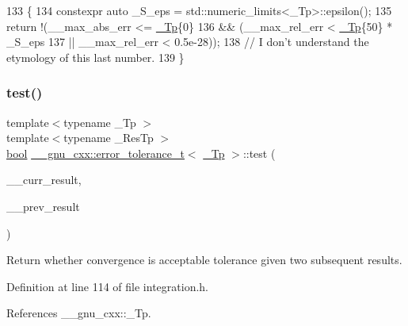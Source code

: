 \begin{DoxyCode}
133       \{
134         constexpr \textcolor{keyword}{auto} \_S\_eps = std::numeric\_limits<\_Tp>::epsilon();
135         \textcolor{keywordflow}{return} !(\_\_max\_abs\_err <= \hyperlink{namespace____gnu__cxx_a3b19a9c800ca194374ef9172290f7d79}{\_Tp}\{0\}
136               && (\_\_max\_rel\_err < \hyperlink{namespace____gnu__cxx_a3b19a9c800ca194374ef9172290f7d79}{\_Tp}\{50\} * \_S\_eps
137                || \_\_max\_rel\_err < 0.5e-28));
138         \textcolor{comment}{// I don't understand the etymology of this last number.}
139       \}
\end{DoxyCode}
\mbox{\label{struct____gnu__cxx_1_1error__tolerance__t_a4376e70909c1b91fe98246a633162497}} 
\subsubsection{\texorpdfstring{test()}{test()}}
{\footnotesize\ttfamily template$<$typename \+\_\+\+Tp $>$ \\
template$<$typename \+\_\+\+Res\+Tp $>$ \\
\hyperlink{namespace____gnu__cxx_ae83aca57f97767d5d09188718728a0ac}{bool} \hyperlink{struct____gnu__cxx_1_1error__tolerance__t}{\+\_\+\+\_\+gnu\+\_\+cxx\+::error\+\_\+tolerance\+\_\+t}$<$ \hyperlink{namespace____gnu__cxx_a3b19a9c800ca194374ef9172290f7d79}{\+\_\+\+Tp} $>$\+::test (\begin{DoxyParamCaption}\item[{\+\_\+\+Res\+Tp}]{\+\_\+\+\_\+curr\+\_\+result,  }\item[{\+\_\+\+Res\+Tp}]{\+\_\+\+\_\+prev\+\_\+result }\end{DoxyParamCaption})\hspace{0.3cm}{\ttfamily [inline]}}



Return whether convergence is acceptable tolerance given two subsequent results. 



Definition at line 114 of file integration.\+h.



References \+\_\+\+\_\+gnu\+\_\+cxx\+::\+\_\+\+Tp.


